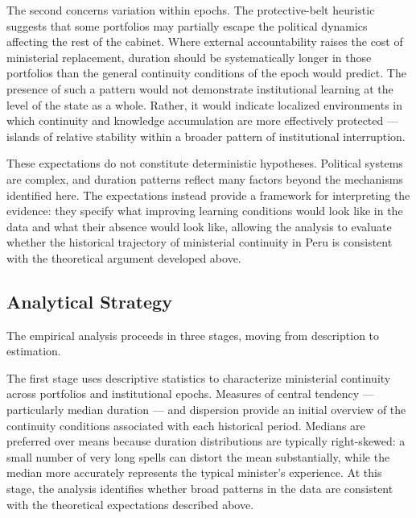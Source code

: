 \documentclass[doc, 12pt, a4paper,floatsintext]{apa7}
\begin{document}
The second concerns variation within epochs. The protective-belt heuristic 
suggests that some portfolios may partially escape the political dynamics 
affecting the rest of the cabinet. Where external accountability raises the 
cost of ministerial replacement, duration should be systematically longer 
in those portfolios than the general continuity conditions of the epoch 
would predict. The presence of such a pattern would not demonstrate 
institutional learning at the level of the state as a whole. Rather, it 
would indicate localized environments in which continuity and knowledge 
accumulation are more effectively protected --- islands of relative 
stability within a broader pattern of institutional interruption.

These expectations do not constitute deterministic hypotheses. Political 
systems are complex, and duration patterns reflect many factors beyond the 
mechanisms identified here. The expectations instead provide a framework 
for interpreting the evidence: they specify what improving learning 
conditions would look like in the data and what their absence would look 
like, allowing the analysis to evaluate whether the historical trajectory 
of ministerial continuity in Peru is consistent with the theoretical 
argument developed above.

\subsection{Analytical Strategy}

The empirical analysis proceeds in three stages, moving from description 
to estimation.

The first stage uses descriptive statistics to characterize ministerial 
continuity across portfolios and institutional epochs. Measures of central 
tendency --- particularly median duration --- and dispersion provide an 
initial overview of the continuity conditions associated with each 
historical period. Medians are preferred over means because duration 
distributions are typically right-skewed: a small number of very long 
spells can distort the mean substantially, while the median more 
accurately represents the typical minister's experience. At this stage, 
the analysis identifies whether broad patterns in the data are consistent 
with the theoretical expectations described above.
\end{document}
